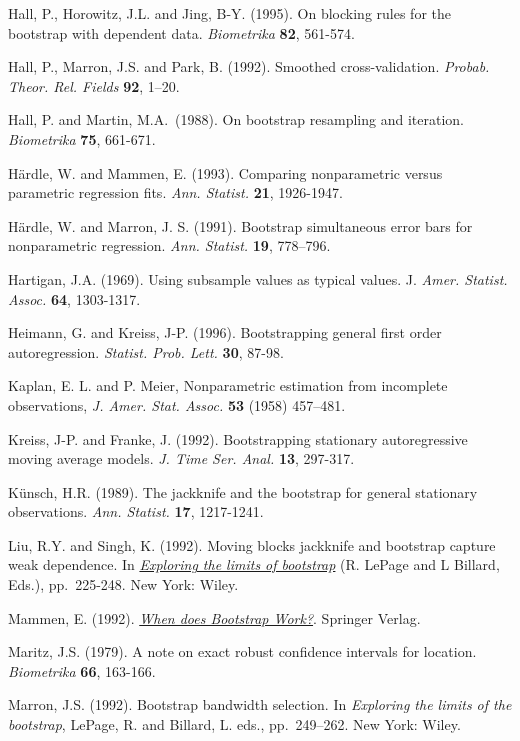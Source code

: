 \documentclass[
]{book}
\theoremstyle{break}
\theoremstyle{definition}
\theoremstyle{definition}
\theoremstyle{definition}
\theoremstyle{definition}
\theoremstyle{remark}
\begin{document}
Hall, P., Horowitz, J.L. and Jing, B-Y. (1995). On blocking rules for
the bootstrap with dependent data. \emph{Biometrika} \textbf{82}, 561-574.

Hall, P., Marron, J.S. and Park, B. (1992). Smoothed cross-validation.
\emph{Probab. Theor. Rel. Fields} \textbf{92}, 1--20.

Hall, P. and Martin, M.A.~(1988). On bootstrap resampling and iteration.
\emph{Biometrika} \textbf{75}, 661-671.

Härdle, W. and Mammen, E. (1993). Comparing nonparametric versus
parametric regression fits. \emph{Ann. Statist.} \textbf{21}, 1926-1947.

Härdle, W. and Marron, J. S. (1991). Bootstrap simultaneous error bars
for nonparametric regression. \emph{Ann. Statist.} \textbf{19}, 778--796.

Hartigan, J.A. (1969). Using subsample values as typical values. J.
\emph{Amer. Statist. Assoc.} \textbf{64}, 1303-1317.

Heimann, G. and Kreiss, J-P. (1996). Bootstrapping general first order
autoregression. \emph{Statist. Prob. Lett.} \textbf{30}, 87-98.

Kaplan, E. L. and P. Meier, Nonparametric estimation from incomplete
observations, \emph{J. Amer. Stat. Assoc.} \textbf{53} (1958) 457--481.

Kreiss, J-P. and Franke, J. (1992). Bootstrapping stationary
autoregressive moving average models. \emph{J. Time Ser. Anal.} \textbf{13},
297-317.

Künsch, H.R. (1989). The jackknife and the bootstrap for general
stationary observations. \emph{Ann. Statist.} \textbf{17}, 1217-1241.

Liu, R.Y. and Singh, K. (1992). Moving blocks jackknife and bootstrap
capture weak dependence. In \href{https://books.google.es/books?hl=es\&lr=\&id=ZJzIpNZNVLgC\&oi=fnd\&pg=PA3\&dq=Exploring+the+limits+of+the+bootstrap}{\emph{Exploring the limits of bootstrap}}
(R. LePage and L Billard, Eds.), pp.~225-248. New York: Wiley.

Mammen, E. (1992). \href{https://books.google.es/books?hl=es\&lr=\&id=zpDfBwAAQBAJ\&oi=fnd\&pg=PP8\&dq=When+does+Bootstrap+Work\%3F}{\emph{When does Bootstrap Work?}}.
Springer Verlag.

Maritz, J.S. (1979). A note on exact robust confidence intervals for
location. \emph{Biometrika} \textbf{66}, 163-166.

Marron, J.S. (1992). Bootstrap bandwidth selection. In
\emph{Exploring the limits of the bootstrap}, LePage, R. and Billard,
L. eds., pp.~249--262. New York: Wiley.
\end{document}
